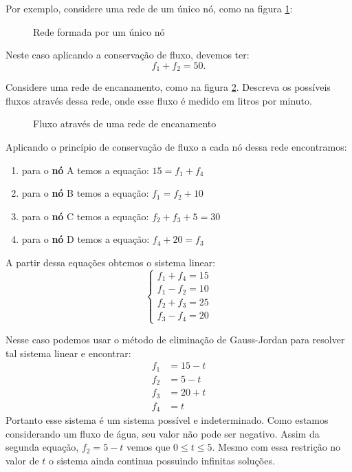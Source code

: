 Por exemplo, considere uma rede de um único nó, como na figura \ref{redenosimples}:
\begin{figure}[!h]
    \centering
    
    \caption{Rede formada por um único nó}
    \label{redenosimples}
\end{figure}

Neste caso aplicando a conservação de fluxo, devemos ter:
\[
    f_1 + f_2 = 50.
\]

\begin{exemplo}
    Considere uma rede de encanamento, como na figura \ref{redeencanamento}. Descreva os possíveis fluxos através dessa rede, onde esse fluxo é medido em litros por minuto.
    \begin{figure}[!h]
        \centering
        
        \caption{Fluxo através de uma rede de encanamento}
        \label{redeencanamento}
    \end{figure}

    Aplicando o princípio de conservação de fluxo a cada nó dessa rede encontramos:

    \begin{enumerate}[label={\roman*})]
        \item para o \textbf{nó} A temos a equação: $15 = f_1 + f_4$
        \item para o \textbf{nó} B temos a equação: $f_1 = f_2 + 10$
        \item para o \textbf{nó} C temos a equação: $f_2 + f_3 + 5 = 30$
        \item para o \textbf{nó} D temos a equação: $f_4 + 20 = f_3$
    \end{enumerate}

    A partir dessa equações obtemos o sistema linear:
    \[
        \begin{cases}
            f_1 + f_4 = 15\\
            f_1 - f_2 = 10\\
            f_2 + f_3 = 25\\
            f_3 - f_4 = 20
        \end{cases}
    \]

    Nesse caso podemos usar o método de eliminação de Gauss-Jordan para resolver tal sistema linear e encontrar:
    \begin{align*}
        f_1 &= 15 - t\\
        f_2 &= 5 - t\\
        f_3 &= 20 + t\\
        f_4 &= t
    \end{align*}
    Portanto esse sistema é um sistema possível e indeterminado. Como estamos considerando um fluxo de água, seu valor não pode ser negativo. Assim da segunda equação, $f_2 = 5 - t$ vemos que $0 \le t \le 5$. Mesmo com essa restrição no valor de $t$ o sistema ainda continua possuindo infinitas soluções.
\end{exemplo}

